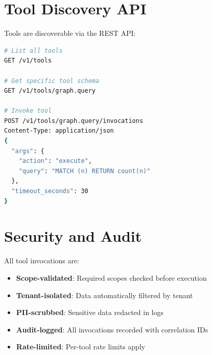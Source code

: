 \section{Tool Discovery API}
\label{app:tools:discovery}

Tools are discoverable via the REST API:

\begin{lstlisting}[language=bash]
# List all tools
GET /v1/tools

# Get specific tool schema
GET /v1/tools/graph.query

# Invoke tool
POST /v1/tools/graph.query/invocations
Content-Type: application/json
{
  "args": {
    "action": "execute",
    "query": "MATCH (n) RETURN count(n)"
  },
  "timeout_seconds": 30
}
\end{lstlisting}

\section{Security and Audit}
\label{app:tools:audit}

All tool invocations are:
\begin{itemize}
    \item \textbf{Scope-validated}: Required scopes checked before execution
    \item \textbf{Tenant-isolated}: Data automatically filtered by tenant
    \item \textbf{PII-scrubbed}: Sensitive data redacted in logs
    \item \textbf{Audit-logged}: All invocations recorded with correlation IDs
    \item \textbf{Rate-limited}: Per-tool rate limits apply
\end{itemize}

